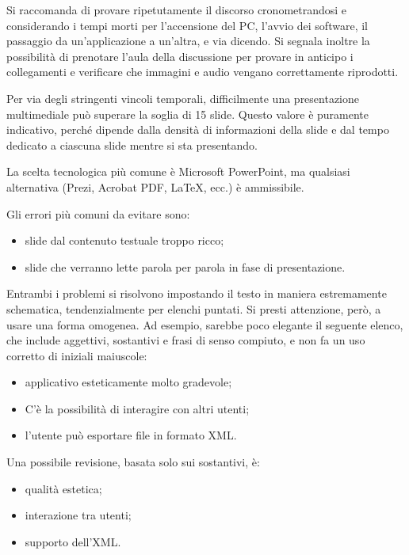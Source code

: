 \documentclass[12pt]{report}
\begin{document}
    Si raccomanda di provare ripetutamente il discorso cronometrandosi e considerando i tempi morti per l'accensione del PC, l'avvio dei software, il passaggio da un'applicazione a un'altra, e via dicendo. Si segnala inoltre la possibilità di prenotare l'aula della discussione per provare in anticipo i collegamenti e verificare che immagini e audio vengano correttamente riprodotti.

    Per via degli stringenti vincoli temporali, difficilmente una presentazione multimediale può superare la soglia di 15 slide. Questo valore è puramente indicativo, perché dipende dalla densità di informazioni della slide e dal tempo dedicato a ciascuna slide mentre si sta presentando.

    La scelta tecnologica più comune è Microsoft PowerPoint, ma qualsiasi alternativa (Prezi, Acrobat PDF, \LaTeX, ecc.) è ammissibile.

    Gli errori più comuni da evitare sono:
    \begin{itemize}
        \item slide dal contenuto testuale troppo ricco;
        \item slide che verranno lette parola per parola in fase di presentazione.
    \end{itemize}

    Entrambi i problemi si risolvono impostando il testo in maniera estremamente schematica, tendenzialmente per elenchi puntati. Si presti attenzione, però, a usare una forma omogenea.
    Ad esempio, sarebbe poco elegante il seguente elenco, che include aggettivi, sostantivi e frasi di senso compiuto, e non fa un uso corretto di iniziali maiuscole:
    \begin{itemize}
        \item applicativo esteticamente molto gradevole;
        \item C'è la possibilità di interagire con altri utenti;
        \item l'utente può esportare file in formato XML.
    \end{itemize}

    Una possibile revisione, basata solo sui sostantivi, è:
    \begin{itemize}
        \item qualità estetica;
        \item interazione tra utenti;
        \item supporto dell'XML.
    \end{itemize}
\end{document}
